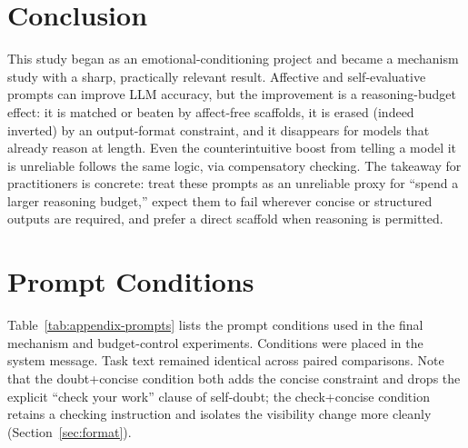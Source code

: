 \documentclass{article}
\begin{document}
\section{Conclusion}

This study began as an emotional-conditioning project and became a mechanism study with a sharp, practically relevant result. Affective and self-evaluative prompts can improve LLM accuracy, but the improvement is a reasoning-budget effect: it is matched or beaten by affect-free scaffolds, it is erased (indeed inverted) by an output-format constraint, and it disappears for models that already reason at length. Even the counterintuitive boost from telling a model it is unreliable follows the same logic, via compensatory checking. The takeaway for practitioners is concrete: treat these prompts as an unreliable proxy for ``spend a larger reasoning budget,'' expect them to fail wherever concise or structured outputs are required, and prefer a direct scaffold when reasoning is permitted.




\newpage
\appendix

\section{Prompt Conditions}

Table~\ref{tab:appendix-prompts} lists the prompt conditions used in the final mechanism and budget-control experiments. Conditions were placed in the system message. Task text remained identical across paired comparisons. Note that the doubt+concise condition both adds the concise constraint and drops the explicit ``check your work'' clause of self-doubt; the check+concise condition retains a checking instruction and isolates the visibility change more cleanly (Section~\ref{sec:format}).
\end{document}
